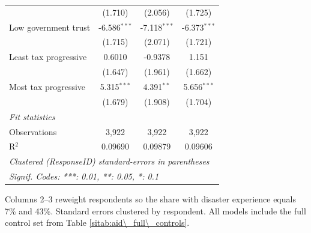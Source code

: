 \begin{table}[htbp]
\begin{tabular}{lccc}
                                   & (1.710)        & (2.056)         & (1.725)\\   
      Low government trust         & -6.586$^{***}$ & -7.118$^{***}$  & -6.373$^{***}$\\   
                                   & (1.715)        & (2.071)         & (1.721)\\   
      Least tax progressive        & 0.6010         & -0.9378         & 1.151\\   
                                   & (1.647)        & (1.961)         & (1.662)\\   
      Most tax progressive         & 5.315$^{***}$  & 4.391$^{**}$    & 5.656$^{***}$\\   
                                   & (1.679)        & (1.908)         & (1.704)\\   
      \midrule
      \emph{Fit statistics}\\
      Observations                 & 3,922          & 3,922           & 3,922\\  
      R$^2$                        & 0.09690        & 0.09879         & 0.09606\\  
      \midrule \midrule
      \multicolumn{4}{l}{\emph{Clustered (ResponseID) standard-errors in parentheses}}\\
      \multicolumn{4}{l}{\emph{Signif. Codes: ***: 0.01, **: 0.05, *: 0.1}}\\
   \end{tabular}
   
   \par \raggedright 
   Columns 2--3 reweight respondents so the share with disaster experience equals 7\% and 43\%. Standard errors clustered by respondent. All models include the full control set from Table \ref{sitab:aid\_full\_controls}.
\end{table}


